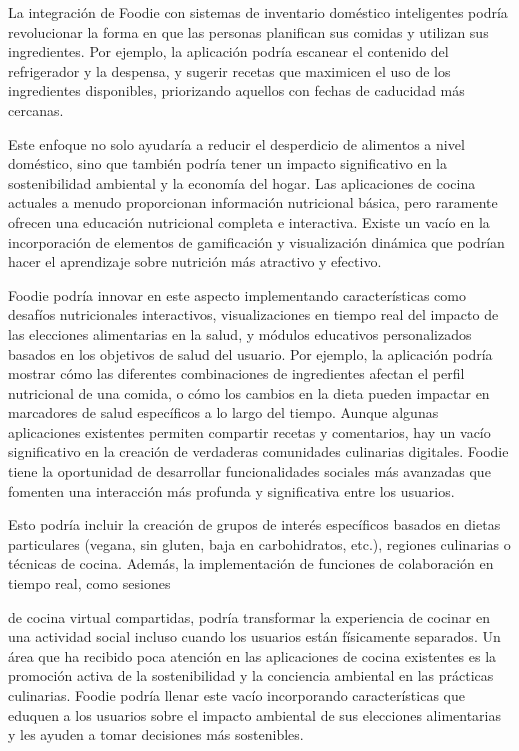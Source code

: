 \documentclass[a4paper,12pt]{article}
\begin{document}
La integración de Foodie con sistemas de inventario doméstico inteligentes podría revolucionar la forma en que las personas planifican sus comidas y utilizan sus ingredientes. Por ejemplo, la aplicación podría escanear el contenido del refrigerador y la despensa, y sugerir recetas que maximicen el uso de los ingredientes disponibles, priorizando aquellos con fechas de caducidad más cercanas. 

Este enfoque no solo ayudaría a reducir el desperdicio de alimentos a nivel doméstico, sino que también podría tener un impacto significativo en la sostenibilidad ambiental y la economía del hogar.
Las aplicaciones de cocina actuales a menudo proporcionan información nutricional básica, pero raramente ofrecen una educación nutricional completa e interactiva. Existe un vacío en la incorporación de elementos de gamificación y visualización dinámica que podrían hacer el aprendizaje sobre nutrición más atractivo y efectivo.

Foodie podría innovar en este aspecto implementando características como desafíos nutricionales interactivos, visualizaciones en tiempo real del impacto de las elecciones alimentarias en la salud, y módulos educativos personalizados basados en los objetivos de salud del usuario. Por ejemplo, la aplicación podría mostrar cómo las diferentes combinaciones de ingredientes afectan el perfil nutricional de una comida, o cómo los cambios en la dieta pueden impactar en marcadores de salud específicos a lo largo del tiempo.
Aunque algunas aplicaciones existentes permiten compartir recetas y comentarios, hay un vacío significativo en la creación de verdaderas comunidades culinarias digitales. Foodie tiene la oportunidad de desarrollar funcionalidades sociales más avanzadas que fomenten una interacción más profunda y significativa entre los usuarios.

Esto podría incluir la creación de grupos de interés específicos basados en dietas particulares (vegana, sin gluten, baja en carbohidratos, etc.), regiones culinarias o técnicas de cocina. Además, la implementación de funciones de colaboración en tiempo real, como sesiones
 
de cocina virtual compartidas, podría transformar la experiencia de cocinar en una actividad social incluso cuando los usuarios están físicamente separados.
Un área que ha recibido poca atención en las aplicaciones de cocina existentes es la promoción activa de la sostenibilidad y la conciencia ambiental en las prácticas culinarias. Foodie podría llenar este vacío incorporando características que eduquen a los usuarios sobre el impacto ambiental de sus elecciones alimentarias y les ayuden a tomar decisiones más sostenibles.
\end{document}

